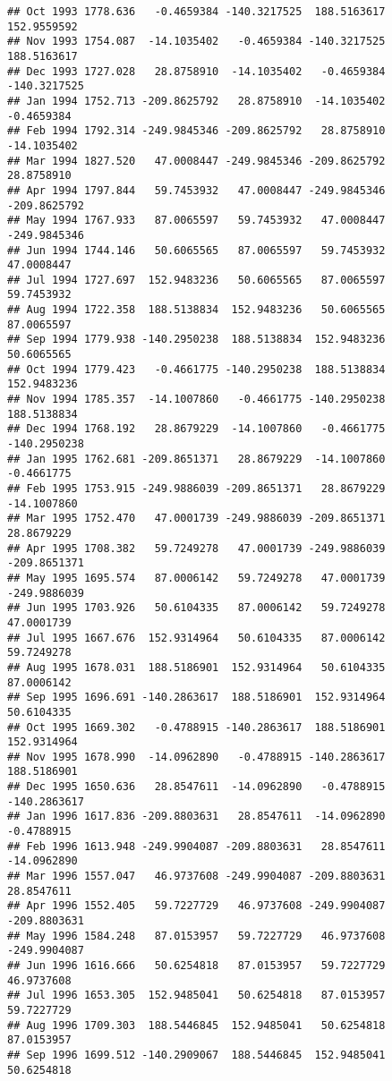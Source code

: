 \documentclass[]{article}
\begin{document}
\begin{verbatim}
## Oct 1993 1778.636   -0.4659384 -140.3217525  188.5163617  152.9559592
## Nov 1993 1754.087  -14.1035402   -0.4659384 -140.3217525  188.5163617
## Dec 1993 1727.028   28.8758910  -14.1035402   -0.4659384 -140.3217525
## Jan 1994 1752.713 -209.8625792   28.8758910  -14.1035402   -0.4659384
## Feb 1994 1792.314 -249.9845346 -209.8625792   28.8758910  -14.1035402
## Mar 1994 1827.520   47.0008447 -249.9845346 -209.8625792   28.8758910
## Apr 1994 1797.844   59.7453932   47.0008447 -249.9845346 -209.8625792
## May 1994 1767.933   87.0065597   59.7453932   47.0008447 -249.9845346
## Jun 1994 1744.146   50.6065565   87.0065597   59.7453932   47.0008447
## Jul 1994 1727.697  152.9483236   50.6065565   87.0065597   59.7453932
## Aug 1994 1722.358  188.5138834  152.9483236   50.6065565   87.0065597
## Sep 1994 1779.938 -140.2950238  188.5138834  152.9483236   50.6065565
## Oct 1994 1779.423   -0.4661775 -140.2950238  188.5138834  152.9483236
## Nov 1994 1785.357  -14.1007860   -0.4661775 -140.2950238  188.5138834
## Dec 1994 1768.192   28.8679229  -14.1007860   -0.4661775 -140.2950238
## Jan 1995 1762.681 -209.8651371   28.8679229  -14.1007860   -0.4661775
## Feb 1995 1753.915 -249.9886039 -209.8651371   28.8679229  -14.1007860
## Mar 1995 1752.470   47.0001739 -249.9886039 -209.8651371   28.8679229
## Apr 1995 1708.382   59.7249278   47.0001739 -249.9886039 -209.8651371
## May 1995 1695.574   87.0006142   59.7249278   47.0001739 -249.9886039
## Jun 1995 1703.926   50.6104335   87.0006142   59.7249278   47.0001739
## Jul 1995 1667.676  152.9314964   50.6104335   87.0006142   59.7249278
## Aug 1995 1678.031  188.5186901  152.9314964   50.6104335   87.0006142
## Sep 1995 1696.691 -140.2863617  188.5186901  152.9314964   50.6104335
## Oct 1995 1669.302   -0.4788915 -140.2863617  188.5186901  152.9314964
## Nov 1995 1678.990  -14.0962890   -0.4788915 -140.2863617  188.5186901
## Dec 1995 1650.636   28.8547611  -14.0962890   -0.4788915 -140.2863617
## Jan 1996 1617.836 -209.8803631   28.8547611  -14.0962890   -0.4788915
## Feb 1996 1613.948 -249.9904087 -209.8803631   28.8547611  -14.0962890
## Mar 1996 1557.047   46.9737608 -249.9904087 -209.8803631   28.8547611
## Apr 1996 1552.405   59.7227729   46.9737608 -249.9904087 -209.8803631
## May 1996 1584.248   87.0153957   59.7227729   46.9737608 -249.9904087
## Jun 1996 1616.666   50.6254818   87.0153957   59.7227729   46.9737608
## Jul 1996 1653.305  152.9485041   50.6254818   87.0153957   59.7227729
## Aug 1996 1709.303  188.5446845  152.9485041   50.6254818   87.0153957
## Sep 1996 1699.512 -140.2909067  188.5446845  152.9485041   50.6254818

\end{verbatim}
\end{document}
